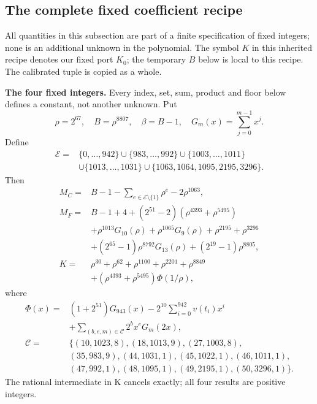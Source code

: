\subsection{The complete fixed coefficient recipe}
All quantities in this subsection are part of a finite specification of fixed
integers; none is an additional unknown in the polynomial.
The symbol $K$ in this inherited recipe denotes
our fixed port $K_0$; the temporary $B$ below is local to this recipe. The
calibrated tuple is copied as a whole.\par
\begingroup
\providecommand{\fl}[1]{\left\lfloor#1\right\rfloor}
\providecommand{\rg}[2]{\{#1,\ldots,#2\}}
\textbf{The four fixed integers.}
Every index, set, sum, product and floor below defines a constant, not
another unknown. Put
\[
\rho=2^{67},\quad B=\rho^{8807},\quad\beta=B-1,\quad
G_m(x)=\sum_{j=0}^{m-1}x^j.
\]
Define
\[
\begin{split}
\mathcal E={}&\rg0{942}\cup\rg{983}{992}\cup\rg{1003}{1011}\\
&\cup\rg{1013}{1031}\cup\{1063,1064,1095,2195,3296\}.
\end{split}
\]
Then
\begin{align*}
M_C={}&B-1-\sum_{e\in\mathcal E\setminus\{1\}}\rho^e-2\rho^{1063},\\
M_F={}&B-1+4+(2^{51}-2)(\rho^{4393}+\rho^{5495})\\
&+\rho^{1013}G_{10}(\rho)+\rho^{1065}G_9(\rho)
  +\rho^{2195}+\rho^{3296}\\
&+(2^{65}-1)\rho^{8792}G_{13}(\rho)+(2^{19}-1)\rho^{8805},\\
K={}&\rho^{30}+\rho^{62}+\rho^{1100}+\rho^{2201}+\rho^{8849}\\
&+(\rho^{4393}+\rho^{5495})\Phi(1/\rho),
\end{align*}
where
\[
\begin{split}
\Phi(x)={}&(1+2^{51})G_{943}(x)
 -2^{10}\sum_{i=0}^{942}v(t_i)x^i\\
&+\sum_{(b,e,m)\in\mathcal C}2^b x^e G_m(2x),\\
\mathcal C={}&\{(10,1023,8),(18,1013,9),(27,1003,8),\\
&(35,983,9),(44,1031,1),(45,1022,1),(46,1011,1),\\
&(47,992,1),(48,1095,1),(49,2195,1),(50,3296,1)\}.
\end{split}
\]
The rational intermediate in K cancels exactly; all four results are positive integers.

